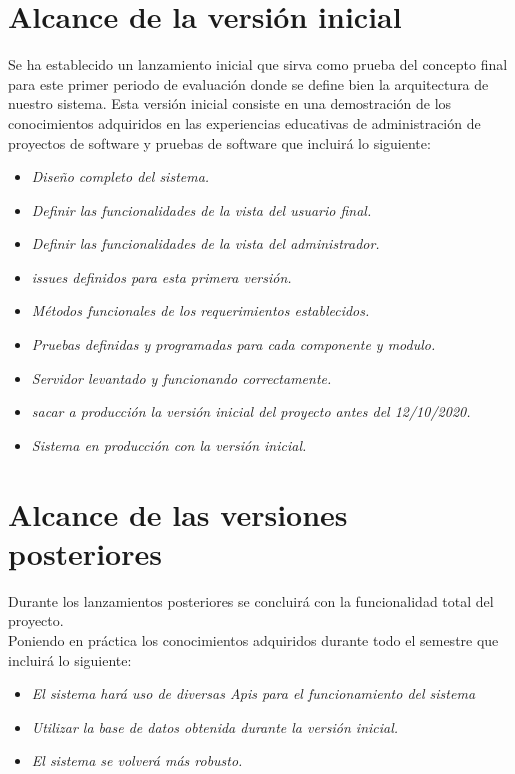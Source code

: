 \documentclass[12pt,a4paper]{book}
\begin{document}
\section{Alcance de la versión inicial}
\vspace{0.5 cm}
Se ha establecido un lanzamiento inicial que sirva como prueba del concepto final para este primer periodo de evaluación donde se define bien la arquitectura de nuestro sistema.
Esta versión inicial consiste en una demostración de los conocimientos adquiridos en las experiencias educativas de administración de proyectos de software y pruebas de software que incluirá lo siguiente: \\
\vspace{0.5 cm}
\begin{itemize}
\item \textit{Diseño completo del sistema.}
\item \textit{Definir las funcionalidades de la vista del usuario final.}
\item \textit{Definir las funcionalidades de la vista del administrador.}
\item \textit{issues definidos para esta primera versión.}
\item \textit{Métodos funcionales de los requerimientos establecidos.}
\item \textit{Pruebas definidas y programadas para cada componente y modulo.}
\item \textit{Servidor levantado y funcionando correctamente.}
\item \textit{sacar a producción la versión inicial del proyecto antes del 12/10/2020.}
\item \textit{Sistema en producción con la versión inicial.}
\end{itemize} 
\newpage
\section{Alcance de las versiones posteriores}
\vspace{0.5 cm}
Durante los lanzamientos posteriores se concluirá con la funcionalidad total del proyecto.\\
Poniendo en práctica los conocimientos adquiridos durante todo el semestre que incluirá lo siguiente: \\
\begin{itemize}
\item \textit{El sistema hará uso de diversas Apis para el funcionamiento del sistema}
\item \textit{Utilizar la base de datos obtenida durante la versión inicial.}
\item \textit{El sistema se volverá más robusto.}
\end{itemize} 
\newpage
\end{document}
